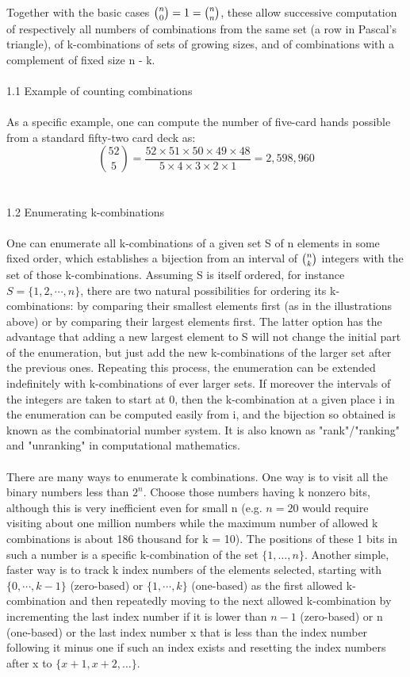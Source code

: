 \documentclass[12pt]{article}
\begin{document}
Together with the basic cases ${\tbinom {n}{0}}=1={\tbinom {n}{n}}$, these allow successive computation of respectively all numbers of combinations from the same set (a row in Pascal's triangle), of k-combinations of sets of growing sizes, and of combinations with a complement of fixed size n - k.\\\\
{\large 1.1 Example of counting combinations}\\\\
As a specific example, one can compute the number of five-card hands possible from a standard fifty-two card deck as:
$${\binom {52}{5}}=\frac {52\times 51 \times 50 \times 49 \times 48}{5 \times 4 \times 3 \times 2 \times 1}=2,598,960$$\\\\
{\large 1.2 Enumerating k-combinations}\\\\
One can enumerate all k-combinations of a given set S of n elements in some fixed order, which establishes a bijection from an interval of ${\tbinom{n}{k}}$ integers with the set of those k-combinations. Assuming S is itself ordered, for instance $S = \{ 1, 2, \cdots, n \}$, there are two natural possibilities for ordering its k-combinations: by comparing their smallest elements first (as in the illustrations above) or by comparing their largest elements first. The latter option has the advantage that adding a new largest element to S will not change the initial part of the enumeration, but just add the new k-combinations of the larger set after the previous ones. Repeating this process, the enumeration can be extended indefinitely with k-combinations of ever larger sets. If moreover the intervals of the integers are taken to start at 0, then the k-combination at a given place i in the enumeration can be computed easily from i, and the bijection so obtained is known as the combinatorial number system. It is also known as "rank"/"ranking" and "unranking" in computational mathematics.\\\\
There are many ways to enumerate k combinations. One way is to visit all the binary numbers less than $2^n$. Choose those numbers having k nonzero bits, although this is very inefficient even for small n (e.g. $ n = 20$ would require visiting about one million numbers while the maximum number of allowed k combinations is about 186 thousand for k = 10). The positions of these 1 bits in such a number is a specific k-combination of the set $\{ 1, …, n \}$. Another simple, faster way is to track k index numbers of the elements selected, starting with $\{ 0,\cdots, k-1\}$ (zero-based) or $\{1,\cdots ,k\}$ (one-based) as the first allowed k-combination and then repeatedly moving to the next allowed k-combination by incrementing the last index number if it is lower than $n-1$ (zero-based) or n (one-based) or the last index number x that is less than the index number following it minus one if such an index exists and resetting the index numbers after x to $\{x+1, x+2, …\}$.
\end{document}
